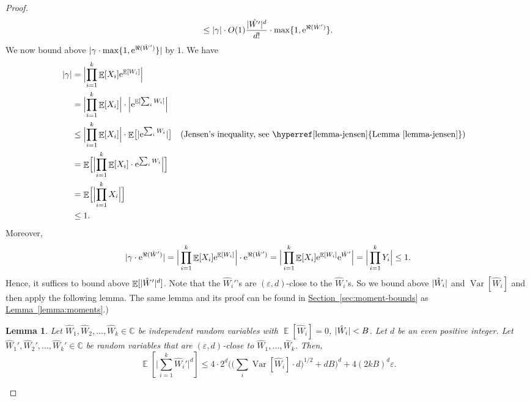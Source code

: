 \documentclass[11pt]{article}
\numberwithin{equation}{section}
\newtheorem{lemma}[theorem]{Lemma}
\theoremstyle{definition}
\theoremstyle{plain}
\newcommand{\C}{\mathbb C}
\newcommand{\eee}{\mathrm e}
\newcommand{\expref}[2]{\hyperref[#2]{#1~\ref{#2}}}
\def\eps{\varepsilon}
\DeclarePairedDelimiter{\abs}{\lvert}{\rvert}
\DeclareMathOperator*{\E}{\mathbb{E}}                 %
\DeclareMathOperator*{\Var}{Var}                 %
\begin{document}
\begin{proof}
\[      \le \abs{\gamma} \cdot O(1) \frac{ \abs{\hat {W'}}^d }{ d! } \cdot \max\{ 1, \eee^{\Re(\hat W')} \} .
    \]
    We now bound above $\abs{\gamma \cdot \max\{1, \eee^{\Re(\hat W')}\}}$ by $1$.
    We have
    \begin{align*}
      \abs{\gamma}
      &= \Bigl| \prod_{i = 1}^k \E[X_i] \eee^{\E[W_i]} \Bigr| \\
      &= \Bigl| \prod_{i = 1}^k \E[X_i] \Bigr| \cdot \Bigl| \eee^{\E[\sum_i W_i]} \Bigr| \\
      &\le \Bigl| \prod_{i = 1}^k \E[X_i] \Bigr| \cdot \E\bigl[ \abs{ \eee^{ \sum_i W_i} } \bigr] && \text{(Jensen's inequality, see \expref{Lemma}{lemma-jensen})} \\
      &= \E \Bigl[ \Bigl| \prod_{i = 1}^k \E[X_i] \cdot \eee^{ \sum_i W_i} \Bigr| \Bigr] \\
      &= \E \Bigl[ \Bigl| \prod_{i = 1}^k X_i \Bigr| \Bigr] \\
      &\le 1 .
    \end{align*}
    Moreover,
    \begin{align*}
      \abs{\gamma \cdot \eee^{\Re(\hat W')}}
      = \Big| \prod_{i = 1}^k \E[X_i] \eee^{\E[W_i]} \Big| \cdot \eee^{\Re(\hat W')}
      = \Big| \prod_{i = 1}^k \E[X_i] \eee^{\E[W_i]} \eee^{\hat W'} \Big|
      = \Big| \prod_{i = 1}^k Y_i \Big|
      \le 1 .
    \end{align*}
    Hence, it suffices to bound above $\E[\abs{\hat W'}^d]$.
    Note that the $\hat W_i'$'s are $(\eps, d)$-close to the $\hat W_i$'s.
    So we bound above $\abs{\hat W_i}$ and $\Var[\hat W_i]$ and then apply the following lemma. 
    The same lemma and its proof can be found in \expref{Section}{sec:moment-bounds} as \expref{Lemma}{lemma:moments}.)

    \begin{lemma} \label{lemma-moments-bound-almost-independent}
      Let $\hat W_1, \hat W_2, \ldots, \hat W_k \in \C$ be independent random variables with $\E[\hat W_i] = 0$, $\abs{\hat W_i} < B$.
      Let $d$ be an even positive integer.
      Let $\hat W_1', \hat W_2', \ldots, \hat W_k' \in \C$ be random variables that are $(\eps, d)$-close to $\hat W_1, \ldots, \hat W_k$.
      Then,
      \[
        \E \left[ \Big| \sum_{i = 1}^k \hat W_i' \Big|^d \right]
        \le 4 \cdot 2^d \Big( \Big( \sum_i \Var[\hat W_i] \cdot d \Big)^{1/2} + d B \Big)^d + 4 (2kB)^d \eps.
      \]
    \end{lemma}


\end{proof}
\end{document}
